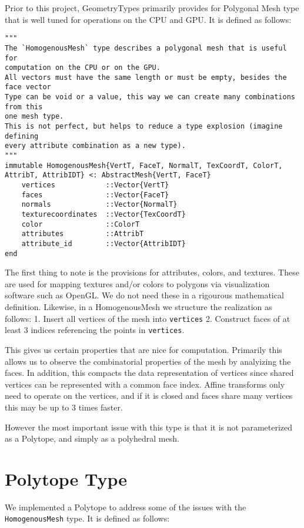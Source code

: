 Prior to this project, GeometryTypes primarily provides for Polygonal Mesh
type that is well tuned for operations on the CPU and GPU. It is defined
as follows:

\begin{lstlisting}
"""
The `HomogenousMesh` type describes a polygonal mesh that is useful for
computation on the CPU or on the GPU.
All vectors must have the same length or must be empty, besides the face vector
Type can be void or a value, this way we can create many combinations from this
one mesh type.
This is not perfect, but helps to reduce a type explosion (imagine defining
every attribute combination as a new type).
"""
immutable HomogenousMesh{VertT, FaceT, NormalT, TexCoordT, ColorT, AttribT, AttribIDT} <: AbstractMesh{VertT, FaceT}
    vertices            ::Vector{VertT}
    faces               ::Vector{FaceT}
    normals             ::Vector{NormalT}
    texturecoordinates  ::Vector{TexCoordT}
    color               ::ColorT
    attributes          ::AttribT
    attribute_id        ::Vector{AttribIDT}
end
\end{lstlisting}

The first thing to note is the provisions for attributes, colors, and textures.
These are used for mapping textures and/or colors to polygons via visualization
software such as
OpenGL. We do not need these in a rigourous mathematical
definition. Likewise, in a HomogenousMesh we structure the realization as
follows: 1. Insert all vertices of the mesh into \texttt{vertices} 2. Construct
faces of at least 3 indices referencing the points in \texttt{vertices}.

This gives us certain properties that are nice for computation. Primarily
this allows us to observe the combinatorial properties of the mesh by analyizing
the faces. In addition, this compacts the data representation of vertices
since shared vertices can be represented with a common face index. Affine
transforms only need to operate on the vertices, and if it is closed and
faces share many vertices this may be up to 3 times faster.

However the most important issue with this type is that it is not
parameterized as a Polytope, and simply as a polyhedral mesh.

\section{Polytope Type}

We implemented a Polytope to address some of the issues with the
\texttt{HomogenousMesh} type. It is defined as follows:

